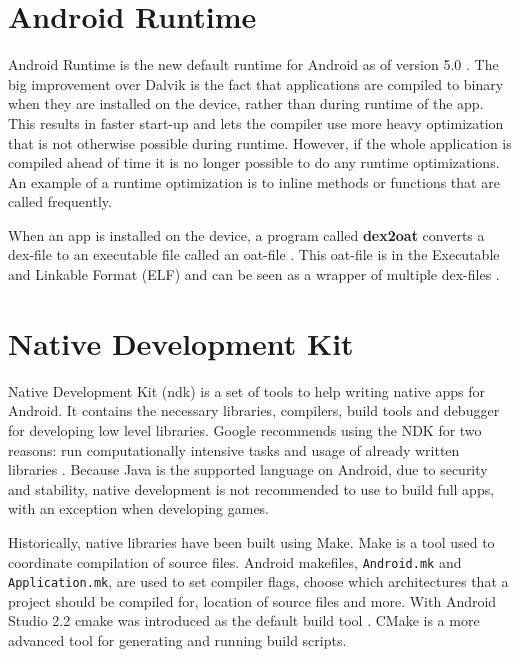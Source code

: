 \section{Android Runtime}
Android Runtime is the new default runtime for Android as of version 5.0 \cite{android:dalvik}. The big improvement over Dalvik is the fact that applications are compiled to binary when they are installed on the device, rather than during runtime of the app. This results in faster start-up \cite{li2016advanced} and lets the compiler use more heavy optimization that is not otherwise possible during runtime. However, if the whole application is compiled ahead of time it is no longer possible to do any runtime optimizations. An example of a runtime optimization is to inline methods or functions that are called frequently.

When an app is installed on the device, a program called \textbf{dex2oat} converts a dex-file to an executable file called an oat-file \cite{android:art:dalvik}. This oat-file is in the Executable and Linkable Format (ELF) and can be seen as a wrapper of multiple dex-files \cite{Dresel2016}.


\section{Native Development Kit}
Native Development Kit (\gls{ndk}) is a set of tools to help writing native apps for Android. It contains the necessary libraries, compilers, build tools and debugger for developing low level libraries. Google recommends using the NDK for two reasons: run computationally intensive tasks and usage of already written libraries \cite{android:ndk:guides}. Because Java is the supported language on Android, due to security and stability, native development is not recommended to use to build full apps, with an exception when developing games.

Historically, native libraries have been built using Make. Make is a tool used to coordinate compilation of source files. Android makefiles, \texttt{Android.mk} and \texttt{Application.mk}, are used to set compiler flags, choose which architectures that a project should be compiled for, location of source files and more. With Android Studio 2.2 \gls{cmake} was introduced as the default build tool \cite{android:studio:cmake}. CMake is a more advanced tool for generating and running build scripts.

